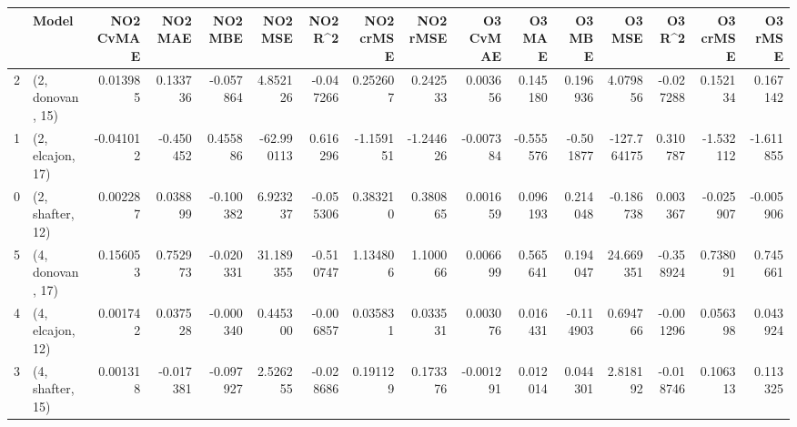 \begin{tabular}{llrrrrrrrrrrrrrr}
\toprule
{} &             Model &  NO2 CvMAE &   NO2 MAE &   NO2 MBE &    NO2 MSE &   NO2 R\textasciicircum2 &  NO2 crMSE &  NO2 rMSE &  O3 CvMAE &    O3 MAE &    O3 MBE &      O3 MSE &    O3 R\textasciicircum2 &  O3 crMSE &   O3 rMSE \\
\midrule
2 &  (2, donovan, 15) &   0.013985 &  0.133736 & -0.057864 &   4.852126 & -0.047266 &   0.252607 &  0.242533 &  0.003656 &  0.145180 &  0.196936 &    4.079856 & -0.027288 &  0.152134 &  0.167142 \\
1 &  (2, elcajon, 17) &  -0.041012 & -0.450452 &  0.455886 & -62.990113 &  0.616296 &  -1.159151 & -1.244626 & -0.007384 & -0.555576 & -0.501877 & -127.764175 &  0.310787 & -1.532112 & -1.611855 \\
0 &  (2, shafter, 12) &   0.002287 &  0.038899 & -0.100382 &   6.923237 & -0.055306 &   0.383210 &  0.380865 &  0.001659 &  0.096193 &  0.214048 &   -0.186738 &  0.003367 & -0.025907 & -0.005906 \\
5 &  (4, donovan, 17) &   0.156053 &  0.752973 & -0.020331 &  31.189355 & -0.510747 &   1.134806 &  1.100066 &  0.006699 &  0.565641 &  0.194047 &   24.669351 & -0.358924 &  0.738091 &  0.745661 \\
4 &  (4, elcajon, 12) &   0.001742 &  0.037528 & -0.000340 &   0.445300 & -0.006857 &   0.035831 &  0.033531 &  0.003076 &  0.016431 & -0.114903 &    0.694766 & -0.001296 &  0.056398 &  0.043924 \\
3 &  (4, shafter, 15) &   0.001318 & -0.017381 & -0.097927 &   2.526255 & -0.028686 &   0.191129 &  0.173376 & -0.001291 &  0.012014 &  0.044301 &    2.818192 & -0.018746 &  0.106313 &  0.113325 \\
\bottomrule
\end{tabular}
